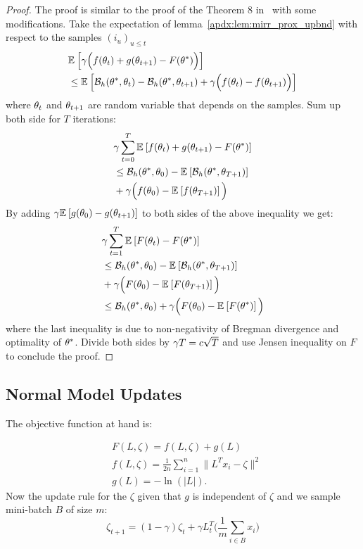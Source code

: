 \begin{subappendices}
\begin{proof}
The proof is similar to the proof of the Theorem 8 in~\citep{duchi2010composite} with some modifications. Take the expectation of lemma~\ref{apdx:lem:mirr_prox_upbnd} with respect to the samples $(i_u)_{u\leq t}$
\begin{align*}
    &\mathbb{E}_{} \left[ \gamma\Big(f(\theta_t) + g(\theta_{t+1}) -F(\theta^{*}) \Big) \right]  \\ 
    &\leq  \mathbb{E}_{} \left[ {\mathcal B}_{h}(\theta^{*},\theta_t) - {\mathcal B}_{h}(\theta^{*},\theta_{t+1})
    + \gamma\Big( f(\theta_t) - f(\theta_{t+1})\Big) \right] 
\end{align*}
where $\theta_t$ and $\theta_{t+1}$ are random variable that depends on the samples.
Sum up both side for $T$ iterations: 
\begin{align*}
    &\gamma \sum_{t=0}^T \mathbb{E}_{} \left[ f(\theta_t) + g(\theta_{t+1}) -F(\theta^{*}) \right]  \\ 
    & \leq {\mathcal B}_{h}(\theta^{*},\theta_0) 
    - \mathbb{E}_{} \left[ {\mathcal B}_{h}(\theta^{*},\theta_{T+1}) \right]  \\
    & + \gamma \Big(f(\theta_{0}) - \mathbb{E}_{} \left[ f(\theta_{T+1}) \right] \Big) 
\end{align*}
By adding $\gamma \mathbb{E}_{} \left[  g(\theta_{0}) - g(\theta_{t+1}) \right]  $ to both sides of the above inequality we get: 
\begin{align*}
    & \gamma \sum_{t=1}^T \mathbb{E}_{} \left[ F(\theta_t) -F(\theta^{*}) \right]  \\
    & \leq {\mathcal B}_{h}(\theta^{*},\theta_0) 
    - \mathbb{E}_{} \left[ {\mathcal B}_{h}(\theta^{*},\theta_{T+1}) \right]  \\
    & + \gamma \Big(F(\theta_{0}) - \mathbb{E}_{} \left[ F(\theta_{T+1}) \right] \Big) \\
    & \leq {\mathcal B}_{h}(\theta^{*},\theta_0) 
    + \gamma \Big(F(\theta_{0}) - \mathbb{E}_{} \left[ F(\theta^{*}) \right] \Big)
\end{align*}
where the last inequality is due to non-negativity of Bregman divergence and optimality of $\theta^{*}$. 
Divide both sides by  $\gamma T = c \sqrt{T}$ and use Jensen inequality on $F$ to conclude the proof.  
\end{proof}

 \subsection{Normal Model Updates}
 \label{apdx:normal_updates}
The objective function at hand is: 

\begin{align*}
    &F(L,\zeta) = f(L,\zeta) + g(L)\\
    &f(L,\zeta) = \frac{1}{2n}\sum_{i=1}^{n} \|L^T x_i - \zeta\|^2\\
    & g(L) = - \ln(|L|). 
\end{align*}
Now the update rule for the $\zeta$ given that $g$ is independent of $\zeta$ and we sample mini-batch $B$ of size $m$:
\[
    \zeta_{t+1} = (1 - \gamma)\zeta_t 
    + \gamma L_t^T \Big(\frac{1}{m} \sum_{i \in B} x_i\Big)
\]


\end{subappendices}
